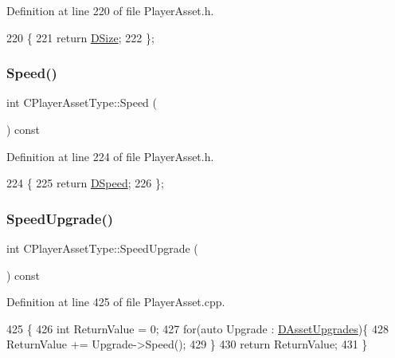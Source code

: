 Definition at line 220 of file Player\+Asset.\+h.


\begin{DoxyCode}
220                         \{
221             \textcolor{keywordflow}{return} \hyperlink{classCPlayerAssetType_a00e59fe19f83fe37f23341c05010dbc2}{DSize};  
222         \};
\end{DoxyCode}
\hypertarget{classCPlayerAssetType_a6d9ea6aa96593e3e08401972b82a705d}{}\label{classCPlayerAssetType_a6d9ea6aa96593e3e08401972b82a705d} 
\subsubsection{\texorpdfstring{Speed()}{Speed()}}
{\footnotesize\ttfamily int C\+Player\+Asset\+Type\+::\+Speed (\begin{DoxyParamCaption}{ }\end{DoxyParamCaption}) const\hspace{0.3cm}{\ttfamily [inline]}}



Definition at line 224 of file Player\+Asset.\+h.


\begin{DoxyCode}
224                          \{
225             \textcolor{keywordflow}{return} \hyperlink{classCPlayerAssetType_a0e72be67119e97fb64a6036cd5da8d1a}{DSpeed};  
226         \};
\end{DoxyCode}
\hypertarget{classCPlayerAssetType_a3c98952e1a08cca0562f80db67451e0e}{}\label{classCPlayerAssetType_a3c98952e1a08cca0562f80db67451e0e} 
\subsubsection{\texorpdfstring{Speed\+Upgrade()}{SpeedUpgrade()}}
{\footnotesize\ttfamily int C\+Player\+Asset\+Type\+::\+Speed\+Upgrade (\begin{DoxyParamCaption}{ }\end{DoxyParamCaption}) const}



Definition at line 425 of file Player\+Asset.\+cpp.


\begin{DoxyCode}
425                                         \{
426     \textcolor{keywordtype}{int} ReturnValue = 0;
427     \textcolor{keywordflow}{for}(\textcolor{keyword}{auto} Upgrade : \hyperlink{classCPlayerAssetType_aeb8d5c3ea81ea56248d02a5e24d48001}{DAssetUpgrades})\{
428         ReturnValue += Upgrade->Speed();
429     \}
430     \textcolor{keywordflow}{return} ReturnValue;
431 \}
\end{DoxyCode}
\hypertarget{classCPlayerAssetType_a09046fe07dd1f9d19c644dba1efac24b}{}\label{classCPlayerAssetType_a09046fe07dd1f9d19c644dba1efac24b} 
